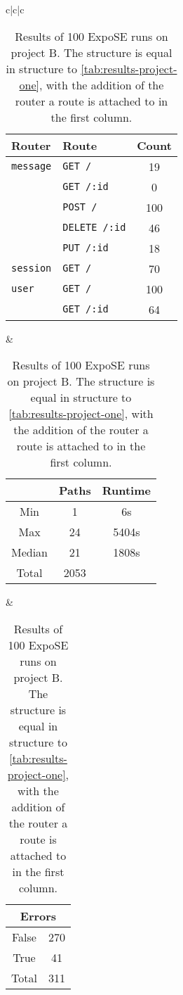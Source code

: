 \begin{table}[t]
    \centering
    \begin{tabular*}{\linewidth}{c|c|c}
       \begin{tabular}[t]{llc}
            \toprule
                        Router          & Route  & Count\\
            \midrule
            \lstinline+message+         & \lstinline+GET /+       & 19    \\
                                        & \lstinline+GET /:id+    & 0   \\
                                        & \lstinline+POST /+      & 100   \\
    	                                & \lstinline+DELETE /:id+ &  46   \\
                                        & \lstinline+PUT /:id+    &  18 \\
            \lstinline+session+         & \lstinline+GET /+       & 70  \\
            \lstinline+user+            & \lstinline+GET /+       & 100 \\                                  
                                        & \lstinline+GET /:id+    & 64   \\
            \bottomrule
        \end{tabular}
  & 
        \begin{tabular}[t]{ccc}
            \toprule
                    & Paths    & Runtime \\
            \midrule
            Min     &  1       & 6s   \\
            Max     &   24     & 5404s       \\
	        Median  &  21      & 1808s        \\
            Total   &   2053   &   \\
            \bottomrule
        \end{tabular} 
&     
        \begin{tabular}[t]{cc}
            \toprule
            \multicolumn{2}{c}{Errors} \\        
            \midrule
            False   &   270 \\
            True    &   41 \\
            Total   &   311  \\
            \bottomrule
        \end{tabular}
\\
    \end{tabular*}
\caption[General results of project B]{Results of 100 ExpoSE runs on project B. The structure is equal in structure to \autoref{tab:results-project-one}, with the addition of the router a route is attached to in the first column. }
\label{tab:results-project-two}
\end{table}
